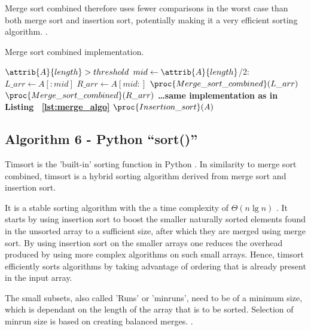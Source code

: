 \documentclass[sigconf, nonacm, natbib, screen, balance=False]{acmart}
\begin{document}
Merge sort combined therefore uses fewer comparisons in the worst case than both merge sort and insertion sort, potentially making it a very efficient sorting algorithm.  \cite{Mergeins20:online}.  

\begin{listing}
  \caption{Merge sort combined implementation.}
  \label{lst:mergecombined_algo}
  
 \begin{codebox}
    \li \If $\attrib{A}{length} > threshold$
    \li \Do
    $mid \gets \attrib{A}{length}$/2: 
    \li $L\_arr\gets A[:mid]$
    \li $R\_arr\gets A[mid:]$
    \li $\proc{Merge\_sort\_combined}(L\_arr)$
    \li $\proc{Merge\_sort\_combined}(R\_arr)$
    \li \textbf{\dots same implementation as in Listing ~\ref{lst:merge_algo}}
    \li \Else
    \li $\proc{Insertion\_sort}(A)$
  \end{codebox}
\end{listing}

\subsection{Algorithm 6 - Python ``sort()'' }\label{sec:algo6}

Timsort is the 'built-in' sorting function in Python \cite{TimsortW72:online}. In similarity to merge sort combined, timsort is a hybrid sorting algorithm derived from merge sort and insertion sort.

It is a stable sorting algorithm with the a time complexity of $\Theta(n\lg n)$ \cite{SortingA29:online}. It starts by using insertion sort to boost the smaller naturally sorted elements found in the unsorted array to a sufficient size, after which they are merged using merge sort. By using insertion sort on the smaller arrays one reduces the overhead produced by using more complex algorithms on such small arrays. Hence, timsort efficiently sorts algorithms by taking advantage of ordering that is already present in the input array.

The small subsets, also called 'Runs' or 'minruns', need to be of a minimum size, which is dependant on the length of the array that is to be sorted. Selection of minrun size is based on creating balanced merges.  \cite{cpythonl70:online}.




\end{document}

